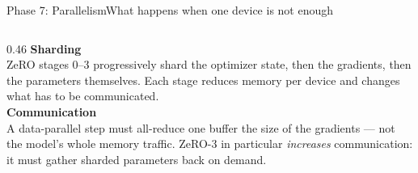 \documentclass[aspectratio=169,11pt]{beamer}
\newcommand{\subtle}[1]{{\footnotesize\color{nxSlate}#1}}
\begin{document}
\begin{frame}{Phase 7: Parallelism}{What happens when one device is not enough}
  \vspace{0.15cm}
  \begin{columns}[T]
    \begin{column}{0.46\textwidth}
      {\bfseries Sharding}\\[4pt]
      \subtle{ZeRO stages 0--3 progressively shard the optimizer state, then the
      gradients, then the parameters themselves. Each stage reduces memory per
      device and changes what has to be communicated.}\\[9pt]

      {\bfseries Communication}\\[4pt]
      \subtle{A data-parallel step must all-reduce one buffer the size of the
      gradients --- not the model's whole memory traffic. ZeRO-3 in particular
      \emph{increases} communication: it must gather sharded parameters back on
      demand.}\\[9pt]


\end{column}
\end{columns}
\end{frame}
\end{document}
